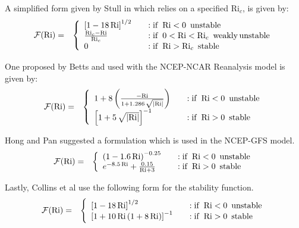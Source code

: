 A simplified form given by Stull in \cite{Jacobson2005,Stull1988} which relies on a
specified $\mathrm{Ri}_c$, is given by:
\begin{eqnarray}\label{VarDiff_Eq_F_Stull}
\mathcal{F}(\mathrm{Ri}) &=& \left\{ \begin{array} {l@{\quad \quad}l}
 \left[ 1 -18 \, \mathrm{Ri} \right]^{1/2}           &: \mathrm{if}\,\,\, \mathrm{Ri} < 0 \,\,\, \mathrm{unstable} \\
 \frac{\mathrm{Ri}_c-\mathrm{Ri}}{\mathrm{Ri}_c}     &: \mathrm{if}\,\,\, 0<\mathrm{Ri} < \mathrm{Ri}_c\,\,\, \mathrm{weakly \, unstable} \\
 0                                                   &: \mathrm{if}\,\,\, \mathrm{Ri} > \mathrm{Ri}_c \,\,\, \mathrm{stable}
\end{array}
\right.
\end{eqnarray}

One proposed by Betts \cite{Betts1996} and used with the NCEP-NCAR Reanalysis model is given by:
\begin{eqnarray}\label{VarDiff_Eq_F_Betts}
\mathcal{F}(\mathrm{Ri}) &=& \left\{ \begin{array} {l@{\quad \quad}l}
 1 + 8 \left( \frac{- \mathrm{Ri}}{1+1.286 \, \sqrt{\left| \mathrm{Ri}\right|}} \right)  &: \mathrm{if}\,\,\, \mathrm{Ri} < 0 \,\,\, \mathrm{unstable} \\
 \left[ 1+ 5 \, \sqrt{\left| \mathrm{Ri}\right|} \right]^{-1}                            &: \mathrm{if}\,\,\, \mathrm{Ri} > 0 \,\,\, \mathrm{stable}
\end{array}
\right.
\end{eqnarray}

Hong and Pan \cite{Hong1996} suggested a formulation which is used in the NCEP-GFS model.
\begin{eqnarray}\label{VarDiff_Eq_F_Hong}
\mathcal{F}(\mathrm{Ri}) &=& \left\{ \begin{array} {l@{\quad \quad}l}
 \left(1 -1.6 \, \mathrm{Ri} \right)^{-0.25}                  &: \mathrm{if}\,\,\, \mathrm{Ri} < 0 \,\,\, \mathrm{unstable} \\
 e^{-8.5 \, \mathrm{Ri}} + \frac{0.15}{\mathrm{Ri} + 3}       &: \mathrm{if}\,\,\, \mathrm{Ri} > 0 \,\,\, \mathrm{stable}
\end{array}
\right.
\end{eqnarray}

Lastly, Collins et al \cite{Collins2004} use the following form for the stability function.
\begin{eqnarray}\label{VarDiff_Eq_F_Collins}
\mathcal{F}(\mathrm{Ri}) &=& \left\{ \begin{array} {l@{\quad \quad}l}
 \left[ 1 -18 \, \mathrm{Ri} \right]^{1/2}                         &: \mathrm{if}\,\,\, \mathrm{Ri} < 0 \,\,\, \mathrm{unstable} \\
 \left[ 1+ 10 \, \mathrm{Ri} \, (1+8 \, \mathrm{Ri}) \right]^{-1}  &: \mathrm{if}\,\,\, \mathrm{Ri} > 0 \,\,\, \mathrm{stable}
\end{array}
\right.
\end{eqnarray}

